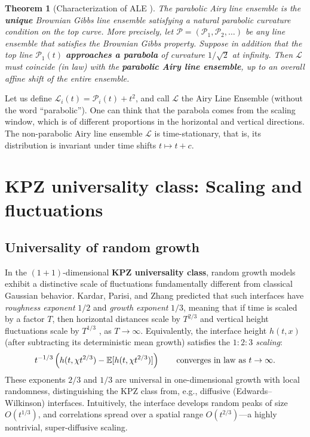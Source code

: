 \documentclass[letterpaper,11pt,oneside,reqno]{book}
\numberwithin{equation}{chapter}  %
\newtheorem{theorem}[proposition]{Theorem}
\theoremstyle{definition}
\begin{document}
\begin{theorem}[Characterization of ALE \cite{AggarwalHuang2023Characterization}]
	The parabolic Airy line ensemble is the \textbf{unique}
	Brownian Gibbs line ensemble satisfying a natural
	parabolic curvature condition on the top curve. More
	precisely, let
	$\boldsymbol{\mathcal{P}}=(\mathcal{P}_1,\mathcal{P}_2,\ldots)$
	be any line ensemble that satisfies the Brownian Gibbs
	property. Suppose in addition that the top line
	$\mathcal{P}_1(t)$ \textbf{approaches a parabola} of
	curvature $1/\sqrt{2}$ at infinity. Then
	$\boldsymbol{\mathcal{L}}$ must coincide (in law) with the
	\textbf{parabolic Airy line ensemble}, up to an overall
	affine shift of the entire ensemble.
\end{theorem}

Let us define $\mathcal{L}_i(t)=\mathcal{P}_i(t)+t^2$, and
call $\mathcal{L}$ the Airy Line Ensemble
(without the word ``parabolic''). One can think that the parabola comes
from the scaling window, which is of different proportions
in the horizontal and vertical directions.
The non-parabolic
Airy line ensemble $\mathcal{L}$ is time-stationary,
that is, its distribution is invariant under time shifts $t\mapsto t+c$.

\section{KPZ universality class: Scaling and fluctuations}

\subsection{Universality of random growth}

In the $(1+1)$-dimensional \textbf{KPZ universality class},
random growth models exhibit a distinctive scale of
fluctuations fundamentally different from classical Gaussian
behavior. Kardar, Parisi, and Zhang \cite{KPZ1986} predicted
that such interfaces have \emph{roughness exponent} $1/2$
and \emph{growth exponent} $1/3$, meaning that if time is
scaled by a factor $T$, then horizontal distances scale by
$T^{2/3}$ and vertical height fluctuations scale by
$T^{1/3}$ \cite{remenik2023integrable}, as $T\to\infty$.
Equivalently, the interface height $h(t,x)$ (after subtracting its deterministic mean growth) satisfies the \emph{$1:2:3$ scaling}:
\[ t^{-1/3}\left(
h(t,\chi t^{2/3})-\mathbb{E}[h(t, \chi t^{2/3})]
\right)\qquad \textnormal{converges in law as } t\to\infty.
\]
These exponents $2/3$ and $1/3$ are universal in
one-dimensional growth with local randomness, distinguishing
the KPZ class from, e.g., diffusive (Edwards–Wilkinson)
interfaces. Intuitively, the interface develops random peaks
of size $O(t^{1/3})$, and correlations spread over a spatial
range $O(t^{2/3})$—a highly nontrivial, super-diffusive
scaling.
\end{document}
